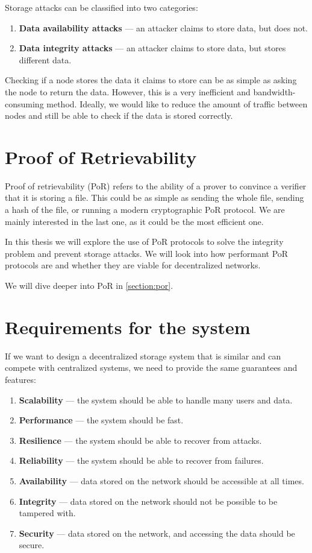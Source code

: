 Storage attacks can be classified into two categories:
\begin{enumerate}
    \item \textbf{Data availability attacks} --- an attacker claims to store data, but does not.
    \item \textbf{Data integrity attacks} --- an attacker claims to store data, but stores different data.
\end{enumerate}

Checking if a node stores the data it claims to store can be as simple as asking the node to return the data.
However, this is a very inefficient and bandwidth-consuming method.
Ideally, we would like to reduce the amount of traffic between nodes and still be able to check
if the data is stored correctly.

\section{Proof of Retrievability}

Proof of retrievability (PoR) refers to the ability of a prover to convince a verifier that it is storing a file.
This could be as simple as sending the whole file, sending a hash of the file, or running a modern
cryptographic PoR protocol.
We are mainly interested in the last one, as it could be the most efficient one.

In this thesis we will explore the use of PoR protocols to solve the
integrity problem and prevent storage attacks.
We will look into how performant PoR protocols are and whether they are viable for decentralized networks.

We will dive deeper into PoR in \ref{section:por}.

\section{Requirements for the system}
\label{section:requirements}

If we want to design a decentralized storage system that is similar and can compete with centralized systems,
we need to provide the same guarantees and features:
\begin{enumerate}
    \item \textbf{Scalability} --- the system should be able to handle many users and data.
    \item \textbf{Performance} --- the system should be fast.
    \item \textbf{Resilience} --- the system should be able to recover from attacks.
    \item \textbf{Reliability} --- the system should be able to recover from failures.
    \item \textbf{Availability} --- data stored on the network should be accessible at all times.
    \item \textbf{Integrity} --- data stored on the network should not be possible to be tampered with.
    \item \textbf{Security} --- data stored on the network, and accessing the data should be secure.
\end{enumerate}

